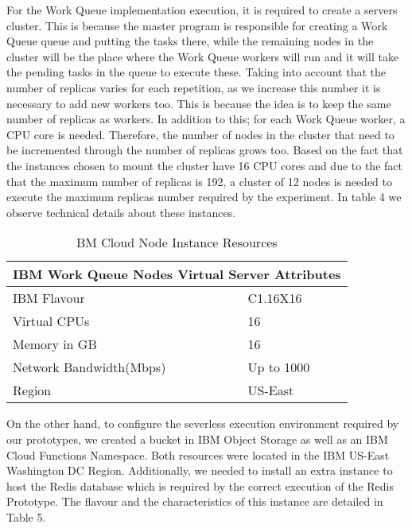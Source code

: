 \documentclass[sigplan, screen]{acmart}
\begin{document}
\noindent
For the Work Queue implementation execution, it is required to create a servers cluster. This is because the master program is responsible for creating a Work Queue queue and putting the tasks there, while the remaining nodes in the cluster will be the place where the Work Queue workers will run and it will take the pending tasks in the queue to execute these. Taking into account that the number of replicas varies for each repetition, as we increase this number it is necessary to add new workers too. This is because the idea is to keep the same number of replicas as workers. In addition to this; for each Work Queue worker, a CPU core is needed. Therefore, the number of nodes in the cluster that need to be incremented through the number of replicas grows too. Based on the fact that the instances chosen to mount the cluster have 16 CPU cores and due to the fact that the maximum number of replicas is 192, a cluster of 12 nodes is needed to execute the maximum replicas number required by the experiment. In table 4 we observe technical details about these instances.
\begin{table}[h!]
    \centering
    \begin{tabular}{ | l | p{3cm} |}
        \hline
             \multicolumn{2}{|c|}{IBM Work Queue Nodes Virtual Server Attributes} \\
         \hline
         \hline
             IBM Flavour & C1.16X16 \\
             Virtual CPUs & 16 \\
             Memory in GB & 16 \\
             Network Bandwidth(Mbps) & Up to 1000 \\
             Region & US-East \\
         \hline
    \end{tabular}
    \caption{BM Cloud Node Instance Resources}
    \label{table:4}
    \vspace{-4mm}
\end{table}

On the other hand, to configure the severless execution environment required by  our prototypes, we created a bucket in IBM Object Storage as well as an IBM Cloud Functions Namespace. Both resources were located in the IBM US-East Washington DC Region. Additionally, we needed to install an extra instance to host the Redis database which is required by the correct execution of the Redis Prototype. The flavour and the characteristics of this instance are detailed in Table 5.
\end{document}
